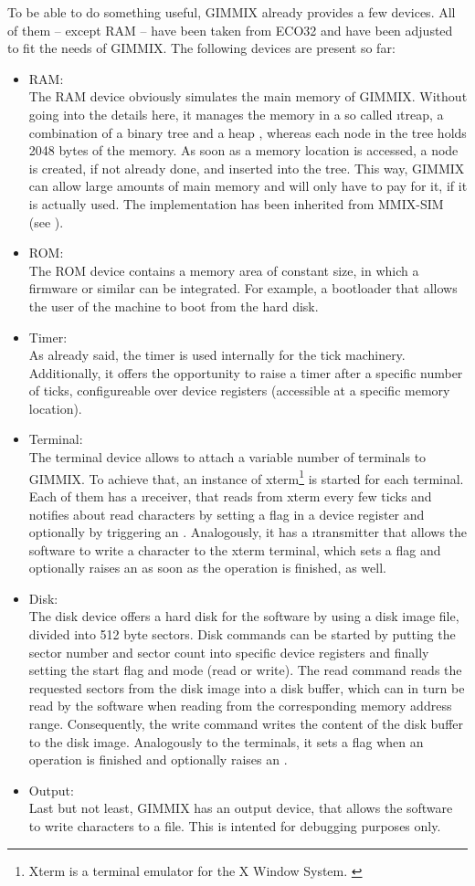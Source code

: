 To be able to do something useful, GIMMIX already provides a few devices. All of them -- except RAM -- have been taken from ECO32 and have been adjusted to fit the needs of GIMMIX. The following devices are present so far:
\begin{itemize}
	\item RAM:\\
	The RAM device obviously simulates the main memory of GIMMIX. Without going into the details here, it manages the memory in a so called \i{treap}, a combination of a binary tree and a heap \citep{treap}, whereas each node in the tree holds 2048 bytes of the memory. As soon as a memory location is accessed, a node is created, if not already done, and inserted into the tree. This way, GIMMIX can allow large amounts of main memory and will only have to pay for it, if it is actually used. The implementation has been inherited from MMIX-SIM (see \citep[pg. 12]{mmix-sim}).
	\item ROM:\\
	The ROM device contains a memory area of constant size, in which a firmware or similar can be integrated. For example, a bootloader that allows the user of the machine to boot from the hard disk.
	\item Timer:\\
	As already said, the timer is used internally for the tick machinery. Additionally, it offers the opportunity to raise a timer  after a specific number of ticks, configureable over device registers (accessible at a specific memory location).
	\item Terminal:\\
	The terminal device allows to attach a variable number of terminals to GIMMIX. To achieve that, an instance of xterm\footnote{Xterm is a terminal emulator for the X Window System. \citep{glxterm}} is started for each terminal. Each of them has a \i{receiver}, that reads from xterm every few ticks and notifies about read characters by setting a flag in a device register and optionally by triggering an . Analogously, it has a \i{transmitter} that allows the software to write a character to the xterm terminal, which sets a flag and optionally raises an  as soon as the operation is finished, as well.
	\item Disk:\\
	The disk device offers a hard disk for the software by using a disk image file, divided into 512 byte sectors. Disk commands can be started by putting the sector number and sector count into specific device registers and finally setting the start flag and mode (read or write). The read command reads the requested sectors from the disk image into a disk buffer, which can in turn be read by the software when reading from the corresponding memory address range. Consequently, the write command writes the content of the disk buffer to the disk image. Analogously to the terminals, it sets a flag when an operation is finished and optionally raises an .
	\item Output:\\
	Last but not least, GIMMIX has an output device, that allows the software to write characters to a file. This is intented for debugging purposes only.
\end{itemize}

